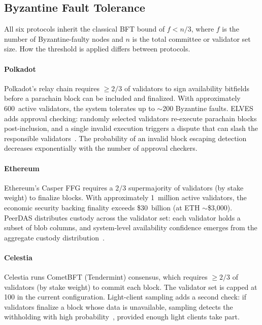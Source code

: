 
\subsection{Byzantine Fault Tolerance}
\label{sec:security-bft}

All six protocols inherit the classical BFT bound of $f < n/3$, where $f$ is the number of Byzantine-faulty nodes and $n$ is the total committee or validator set size.
How the threshold is applied differs between protocols.

\paragraph{Polkadot}
Polkadot's relay chain requires $\geq 2/3$ of validators to sign availability bitfields before a parachain block can be included and finalized.
With approximately 600~active validators, the system tolerates up to $\sim$200 Byzantine faults.
ELVES adds approval checking: randomly selected validators re-execute parachain blocks post-inclusion, and a single invalid execution triggers a dispute that can slash the responsible validators~\cite{Jeff_Burdges_ELVES}.
The probability of an invalid block escaping detection decreases exponentially with the number of approval checkers.

\paragraph{Ethereum}
Ethereum's Casper FFG requires a $2/3$ supermajority of validators (by stake weight) to finalize blocks.
With approximately 1~million active validators, the economic security backing finality exceeds \$30~billion (at ETH $\sim$\$3,000).
PeerDAS distributes custody across the validator set: each validator holds a subset of blob columns, and system-level availability confidence emerges from the aggregate custody distribution~\cite{EIP-7594}.

\paragraph{Celestia}
Celestia runs CometBFT (Tendermint) consensus, which requires $\geq 2/3$ of validators (by stake weight) to commit each block.
The validator set is capped at 100 in the current configuration.
Light-client sampling adds a second check: if validators finalize a block whose data is unavailable, sampling detects the withholding with high probability~\cite{AlBassam_FraudDA}, provided enough light clients take part.

